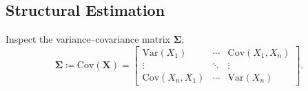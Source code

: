 
\subsection{Structural Estimation}
\label{sec:structural}

Inspect the variance--covariance matrix $\mathbfup{\Sigma}$:
\[
	\mathbfup{\Sigma} \coloneqq
	\mathup{Cov}(\mathbf{X}) =
	\begin{bmatrix}
		\mathup{Var}(X_1)      & \cdots & \mathup{Cov}(X_1, X_n) \\[-2.5pt]
		\vdots                 & \ddots & \vdots                 \\
		\mathup{Cov}(X_n, X_1) & \cdots & \mathup{Var}(X_n)
	\end{bmatrix}.
\]

